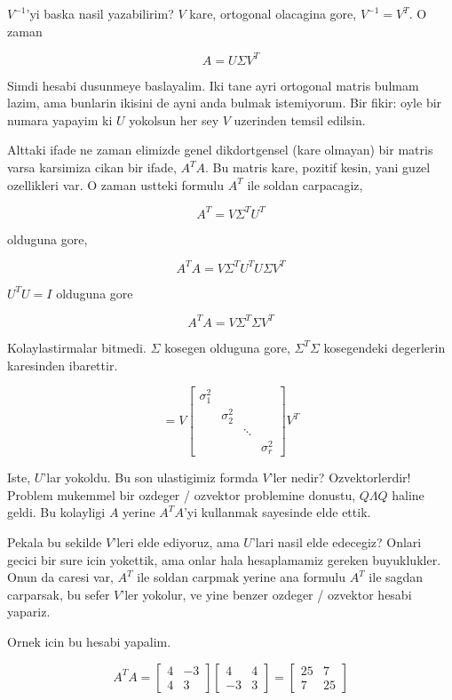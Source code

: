 \documentclass[12pt,fleqn]{article}\usepackage{../common}
\begin{document}
$V^{-1}$'yi baska nasil yazabilirim? $V$ kare, ortogonal olacagina gore,
$V^{-1} = V^{T}$. O zaman 

\[ A = U \Sigma V^{T} \]

Simdi hesabi dusunmeye baslayalim. Iki tane ayri ortogonal matris bulmam
lazim, ama bunlarin ikisini de ayni anda bulmak istemiyorum. Bir fikir:
oyle bir numara yapayim ki $U$ yokolsun her sey $V$ uzerinden temsil
edilsin. 

Alttaki ifade ne zaman elimizde genel dikdortgensel (kare olmayan) bir
matris varsa karsimiza cikan bir ifade, $A^TA$. Bu matris kare, pozitif
kesin, yani guzel ozellikleri var. O zaman ustteki formulu $A^T$ ile soldan
carpacagiz,

\[ A^T = V \Sigma^T U^{T}  \]

olduguna gore,

\[ A^TA = V \Sigma^T U^{T}  U \Sigma V^{T}  \]

$U^TU = I$ olduguna gore

\[ A^TA = V \Sigma^T \Sigma V^{T}  \]

Kolaylastirmalar bitmedi. $\Sigma$ kosegen olduguna gore, $\Sigma^T\Sigma$
kosegendeki degerlerin karesinden ibarettir. 

\[ = V 
\left[\begin{array}{rrrr}
\sigma_1^2 &&& \\
 & \sigma_2^2 &  & \\
&& \ddots & \\
&&& \sigma_r^2 
\end{array}\right] 
V^T
  \]

Iste, $U$'lar yokoldu. Bu son ulastigimiz formda $V$'ler nedir?
Ozvektorlerdir! Problem mukemmel bir ozdeger / ozvektor problemine
donustu, $Q\Lambda Q$ haline geldi. Bu kolayligi $A$ yerine $A^TA$'yi
kullanmak sayesinde elde ettik. 

Pekala bu sekilde $V$'leri elde ediyoruz, ama $U$'lari nasil elde edecegiz?
Onlari gecici bir sure icin yokettik, ama onlar hala hesaplamamiz gereken
buyuklukler. Onun da caresi var, $A^T$ ile soldan carpmak yerine ana
formulu $A^T$ ile sagdan carparsak, bu sefer $V$'ler yokolur, ve yine
benzer ozdeger / ozvektor hesabi yapariz. 

Ornek icin bu hesabi yapalim. 

\[ A^TA = 
\left[\begin{array}{rr}
4 & -3 \\ 4 & 3
\end{array}\right]
\left[\begin{array}{rr}
4 & 4 \\ -3 & 3
\end{array}\right] = 
\left[\begin{array}{cc}
25 & 7 \\ 7 & 25
\end{array}\right]
 \]
\end{document}
